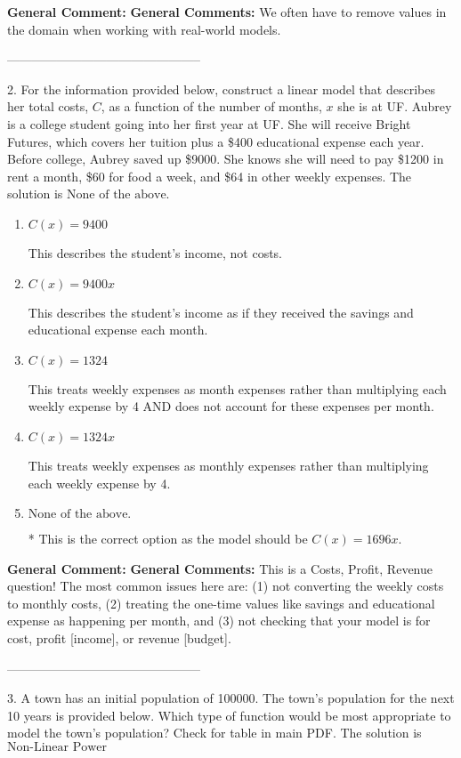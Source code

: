 \documentclass{extbook}[14pt]
\begin{document}
\textbf{General Comment:} \textbf{General Comments:} We often have to remove values in the domain when working with real-world models. 

-----------------------------------------------

2. For the information provided below, construct a linear model that describes her total costs, $C$, as a function of the number of months, $x$ she is at UF. 
Aubrey is a college student going into her first year at UF. She will receive Bright Futures, which covers her tuition plus a \$400 educational expense each year. Before college, Aubrey saved up \$9000. She knows she will need to pay \$1200 in rent a month, \$60 for food a week, and \$64 in other weekly expenses. 
The solution is $ \text{None of the above.} $ 

\begin{enumerate}[label=\Alph*.] 
\item $ C(x) = 9400 $ 

 This describes the student's income, not costs. 
\item $ C(x) = 9400 x $ 

 This describes the student's income as if they received the savings and educational expense each month. 
\item $ C(x) = 1324 $ 

 This treats weekly expenses as month expenses rather than multiplying each weekly expense by 4 AND does not account for these expenses per month. 
\item $ C(x) = 1324 x $ 

 This treats weekly expenses as monthly expenses rather than multiplying each weekly expense by 4. 
\item $ \text{None of the above.} $ 

 * This is the correct option as the model should be $C(x) = 1696 x$. 
\end{enumerate} 
 
\textbf{General Comment:} \textbf{General Comments:} This is a Costs, Profit, Revenue question! The most common issues here are: (1) not converting the weekly costs to monthly costs, (2) treating the one-time values like savings and educational expense as happening per month, and (3) not checking that your model is for cost, profit [income], or revenue [budget]. 

-----------------------------------------------

3. A town has an initial population of 100000. The town's population for the next 10 years is provided below. Which type of function would be most appropriate to model the town's population?
Check for table in main PDF. 
The solution is $ \text{Non-Linear Power} $ 
\end{document}
